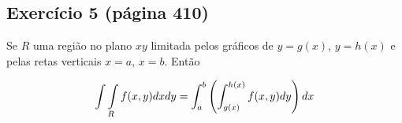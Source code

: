 \documentclass[a4paper,10pt]{report}
\begin{document}
\subsection{Exercício 5 (página 410)}
Se $R$ uma região no plano $xy$ limitada pelos gráficos de $y=g(x)$, $y=h(x)$ e pelas retas verticais $x=a$, $x=b$. Então
        
\begin{equation}
         \int\int\displaylimits_Rf(x,y)dxdy=\int_{a}^{b}\left(\int_{g(x)}^{h(x)}f(x,y)dy\right)dx
\end{equation}
        
  
  

  
\end{document}
